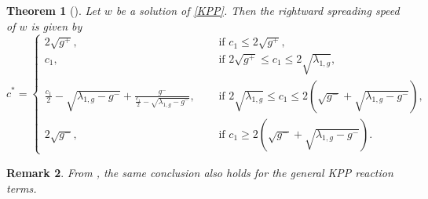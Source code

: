 \documentclass[10pt]{article}
\numberwithin{equation}{section}
\newtheorem{theorem}{Theorem}[section]
\newtheorem{remark}[theorem]{Remark}
\begin{document}
\begin{theorem}[\cite{GGM2024, LNY2024}]\label{Thm-KPP}
Let $w$ be a solution of \eqref{KPP}. Then the rightward  spreading speed of $w$ is given by 
\begin{equation*}
c^*= \begin{cases}
2\sqrt{g^+}, & \text{ if } c_1 \leq 2 \sqrt{g^+}, \\
c_1,   & \text{ if } 2\sqrt{g^+} \leq c_1 \leq  2 \sqrt{\lambda_{1,g}}, \\
\frac{c_1}{2} - \sqrt{\lambda_{1,g}- g^{-} }  + \frac{g^{-}}{\frac{c_1}{2} - \sqrt{\lambda_{1,g}- g^{-} }  },   \quad  & \text{ if }   2 \sqrt{\lambda_{1,g} }  \leq  c_1 \leq 2 (  \sqrt{g^-} + \sqrt{\lambda_{1,g}-g^{-}}),\\
2\sqrt{g^-},    & \text{ if } c_1  \geq   2 (  \sqrt{g^-} + \sqrt{\lambda_{1,g}-g^{-}}).
\end{cases}
\end{equation*}
\end{theorem}
\begin{remark} \label{Rem-kpp}
\rm
From  \cite[Theorem 2.13]{LNY2024},  the  same conclusion also holds for the general KPP  reaction terms. 
\end{remark}
\end{document}
